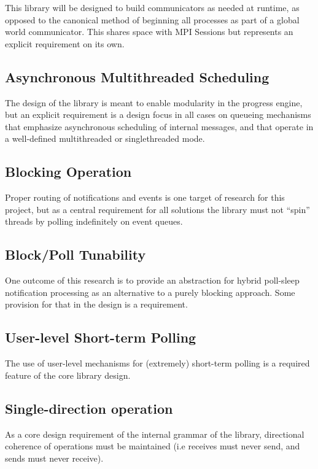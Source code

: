 \documentclass{article}
\begin{document}
This library will be designed to build communicators as needed at runtime, as opposed to the canonical method of beginning all processes as part of a global world communicator.  This shares space with MPI Sessions but represents an explicit requirement on its own.

\subsection{Asynchronous Multithreaded Scheduling}

The design of the library is meant to enable modularity in the progress engine, but an explicit requirement is a design focus in all cases on queueing mechanisms that emphasize asynchronous scheduling of internal messages, and that operate in a well-defined multithreaded or singlethreaded mode.

\subsection{Blocking Operation}

Proper routing of notifications and events is one target of research for this project, but as a central requirement for all solutions the library must not ``spin'' threads by polling indefinitely on event queues.

\subsection{Block/Poll Tunability}

One outcome of this research is to provide an abstraction for hybrid poll-sleep notification processing as an alternative to a purely blocking approach.  Some provision for that in the design is a requirement.

\subsection{User-level Short-term Polling}

The use of user-level mechanisms for (extremely) short-term polling is a required feature of the core library design.

\subsection{Single-direction operation}

As a core design requirement of the internal grammar of the library, directional coherence of operations must be maintained (i.e receives must never send, and sends must never receive).
\end{document}
